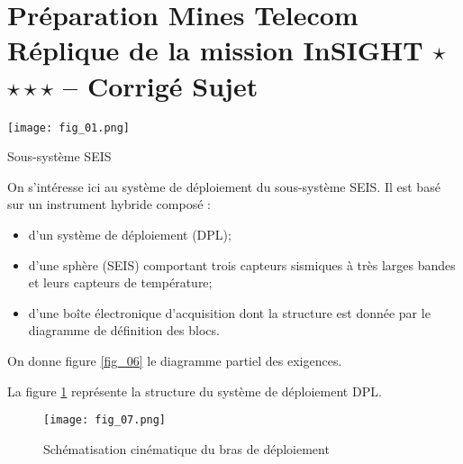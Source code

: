 \chapter*{Préparation Mines Telecom \\%
Réplique de la mission InSIGHT \ifnormal $\star$ \else \fi \iftdifficile $\star\star\star$ \else \fi  -- 
\ifprof Corrigé \else Sujet \fi}

\iflivret {} \else
\ifprof  {} \else \fi
\fi

\setcounter{question}{0}
\marginnote{
\UPSTIcompetence[2]{}
}


\begin{marginfigure}
\texttt{[image: fig\_01.png]}
\caption{Sous-système SEIS \label{fig_01}}
\end{marginfigure}


On s'intéresse ici au système de déploiement du sous-système SEIS. Il est basé sur un instrument hybride composé :
\begin{itemize}
\item d'un système de déploiement (DPL);
\item d'une sphère (SEIS) comportant trois capteurs sismiques à très larges bandes et leurs capteurs de
température;
\item d'une boîte électronique d'acquisition dont la structure est donnée par le diagramme de
définition des blocs. 
\end{itemize}

On donne figure \ref{fig_06} le diagramme partiel des exigences.


La figure \ref{fig_07} représente la structure du système de déploiement DPL.

\begin{figure}[!h]
\centering
\texttt{[image: fig\_07.png]}
\caption{Schématisation cinématique du bras de déploiement \label{fig_07}}
\end{figure}




